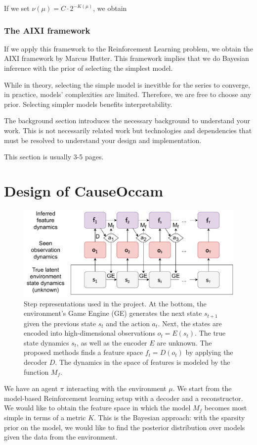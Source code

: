\documentclass[a4paper,11pt,oneside]{report}
\newcommand{\sysname}{CauseOccam\xspace}
\begin{document}
If we set $\nu(\mu)=C\cdot2^{-K(\mu)}$, we obtain

\subsection{The AIXI framework}
\label{subsec:aixi}
If we apply this framework to the Reinforcement Learning problem, we obtain the AIXI framework by Marcus Hutter. This framework implies that we do Bayesian inference with the prior of selecting the simplest model.

While in theory, selecting the simple model is inevitble for the series to converge, in practice, models' complexities are limited. Therefore, we are free to choose any prior. Selecting simpler models benefits interpretability.

The background section introduces the necessary background to understand your
work. This is not necessarily related work but technologies and dependencies
that must be resolved to understand your design and implementation.

This section is usually 3-5 pages.


\chapter{Design of \sysname}
\label{ch:design}
\begin{figure}[h]
    \centering
    \includegraphics[width=0.7\linewidth]{diagrams/step_spaces}
    \caption{Step representations used in the project. At the bottom, the environment's Game Engine (GE) generates the next state $s_{t+1}$ given the previous state $s_t$ and the action $a_t$. Next, the states are encoded into high-dimensional observations $o_t=E(s_t)$. The true state dynamics $s_t$, as well as the encoder $E$ are unknown. The proposed methods finds a feature space $f_t=D(o_t)$ by applying the decoder $D$. The dynamics in the space of features is modeled by the function $M_f$.}
    \label{fig:step_spaces}
\end{figure}


We have an agent $\pi$ interacting with the environment $\mu$. We start from the model-based Reinforcement learning setup with a decoder and a reconstructor. We would like to obtain the feature space in which the model $M_f$ becomes most simple in terms of a metric $K$. This is the Bayesian approach: with the sparsity prior on the model, we would like to find the posterior distribution over models given the data from the environment.
\end{document}

